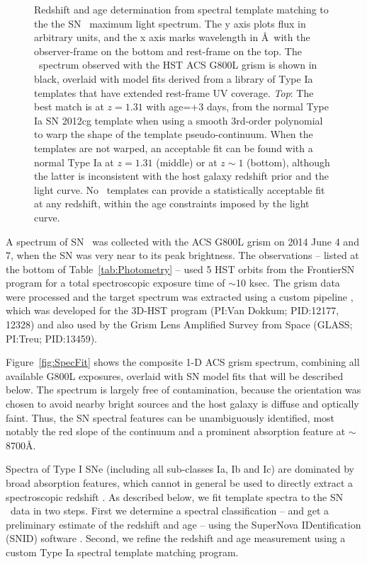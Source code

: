 \begin{figure}
\begin{center}
{Redshift and age determination from spectral template matching to the
the SN \tomas\ maximum light spectrum.  The y axis plots flux in
arbitrary units, and the x axis marks wavelength in \AA\ with the
observer-frame on the bottom and rest-frame on the top.
The \tomas\ spectrum observed with the
HST ACS G800L grism is shown in black, overlaid with model fits
derived from a library of Type Ia templates that have extended
rest-frame UV coverage.  {\it Top}: The best match is at $z=1.31$ with
age=$+3$ days, from the normal Type Ia SN 2012cg template when using a
smooth 3rd-order polynomial to warp the shape of the template
pseudo-continuum.  When the templates are not warped, an acceptable
fit can be found with a normal Type Ia at $z=1.31$ (middle) or at
$z\sim1$ (bottom), although the latter is inconsistent with the host
galaxy redshift prior and the light curve. No \CCSN\ templates can
provide a statistically acceptable fit at any redshift, within the age
constraints imposed by the light curve.}
\end{center}
\end{figure}


A spectrum of SN \tomas\ was collected with the ACS G800L grism on
2014 June 4 and 7, when the SN was very near to its peak brightness.
The observations -- listed at the bottom of Table~\ref{tab:Photometry}
-- used 5 HST orbits from the FrontierSN program for a total
spectroscopic exposure time of $\sim$10 ksec.  The grism data were
processed and the target spectrum was extracted using a custom
pipeline \citep{Brammer:2012}, which was developed for the 3D-HST
program (PI:Van Dokkum; PID:12177, 12328) and also used by the Grism
Lens Amplified Survey from Space (GLASS; PI:Treu; PID:13459).

Figure~\ref{fig:SpecFit} shows the composite 1-D ACS grism spectrum,
combining all available G800L exposures, overlaid with SN model fits
that will be described below.  The spectrum is largely free of
contamination, because the orientation was chosen to avoid nearby
bright sources and the host galaxy is diffuse and optically faint.
Thus, the SN spectral features can be unambiguously identified, most
notably the red slope of the continuum and a prominent absorption
feature at $\sim$8700\AA.  


Spectra of Type I SNe (including all sub-classes Ia, Ib and Ic) are
dominated by broad absorption features, which cannot in general be
used to directly extract a spectroscopic redshift \citep[see
e.g.][]{Filippenko:1997}.  As described below, we fit template spectra
to the SN \tomas\ data in two steps.  First we determine a spectral
classification -- and get a preliminary estimate of the redshift and
age -- using the SuperNova IDentification (SNID)
software \citep{Blondin:2007}.  Second, we refine the redshift and age
measurement using a custom Type Ia spectral template matching program.

